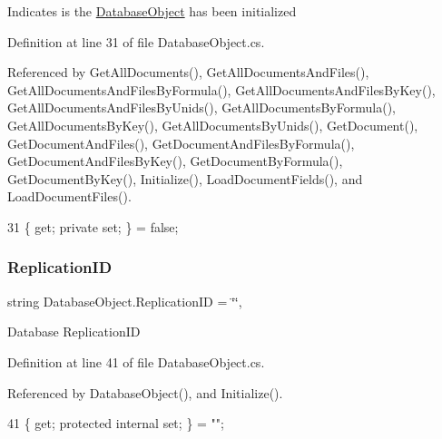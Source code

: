 Indicates is the \mbox{\hyperlink{class_database_object}{Database\+Object}} has been initialized 



Definition at line 31 of file Database\+Object.\+cs.



Referenced by Get\+All\+Documents(), Get\+All\+Documents\+And\+Files(), Get\+All\+Documents\+And\+Files\+By\+Formula(), Get\+All\+Documents\+And\+Files\+By\+Key(), Get\+All\+Documents\+And\+Files\+By\+Unids(), Get\+All\+Documents\+By\+Formula(), Get\+All\+Documents\+By\+Key(), Get\+All\+Documents\+By\+Unids(), Get\+Document(), Get\+Document\+And\+Files(), Get\+Document\+And\+Files\+By\+Formula(), Get\+Document\+And\+Files\+By\+Key(), Get\+Document\+By\+Formula(), Get\+Document\+By\+Key(), Initialize(), Load\+Document\+Fields(), and Load\+Document\+Files().


\begin{DoxyCode}
31 \{ \textcolor{keyword}{get}; \textcolor{keyword}{private} \textcolor{keyword}{set}; \} = \textcolor{keyword}{false};
\end{DoxyCode}
\mbox{\label{class_database_object_aaa091ee1a9a86d2d10fe2381ee2d1f4c}} 
\subsubsection{\texorpdfstring{Replication\+ID}{ReplicationID}}
{\footnotesize\ttfamily string Database\+Object.\+Replication\+ID = \char`\"{}\char`\"{}\hspace{0.3cm}{\ttfamily [get]}, {\ttfamily [set]}}



Database Replication\+ID 



Definition at line 41 of file Database\+Object.\+cs.



Referenced by Database\+Object(), and Initialize().


\begin{DoxyCode}
41 \{ \textcolor{keyword}{get}; \textcolor{keyword}{protected} \textcolor{keyword}{internal} \textcolor{keyword}{set}; \} = \textcolor{stringliteral}{""};
\end{DoxyCode}
\mbox{\label{class_database_object_ad6bfcd30152f7a115ac5a1c7fbfa9fcb}} 
